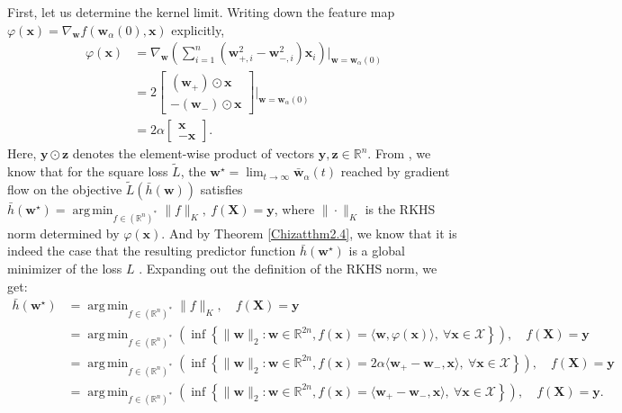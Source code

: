 \documentclass{article}
\DeclareMathOperator*{\argmin}{arg\,min}
\begin{document}
First, let us determine the kernel limit. Writing down the feature map $\varphi(\boldsymbol{x}) = \nabla_{\boldsymbol{w}} f(\boldsymbol{w}_{\alpha}(0), \boldsymbol{x})$ explicitly, 
\begin{align*}
    \varphi(\boldsymbol{x}) &= \nabla_{\boldsymbol{w}}\left( \sum_{i=1}^n(\boldsymbol{w}_{+, i}^2 - \boldsymbol{w}_{-, i}^2)\boldsymbol{x}_i \right)\bigg|_{\boldsymbol{w} = \boldsymbol{w}_{\alpha}(0)}\\
    &= 
    2\begin{bmatrix}
        (\boldsymbol{w}_+) \odot \boldsymbol{x}\\
        -(\boldsymbol{w}_-) \odot \boldsymbol{x}
    \end{bmatrix} \bigg|_{\boldsymbol{w} = \boldsymbol{w}_{\alpha}(0)}\\
    &= 2\alpha \begin{bmatrix}
        \boldsymbol{x}\\
        -\boldsymbol{x}
    \end{bmatrix}.
\end{align*}
Here, $\boldsymbol{y} \odot \boldsymbol{z}$ denotes the element-wise product of vectors $\boldsymbol{y}, \boldsymbol{z} \in \mathbb{R}^n$. From \cite{woodworth2020kernel}, we know that for the square loss $\tilde{L}$, the $\boldsymbol{w}^{\star} = \lim_{t \to \infty} \boldsymbol{\bar{w}}_{\alpha}(t)$ reached by gradient flow on the objective $\tilde{L}(\bar{h}(\boldsymbol{w}))$ satisfies $\bar{h}(\boldsymbol{w}^{\star}) = \argmin_{f \in (\mathbb{R}^n)^*} \| f \|_{K}, \ f(\boldsymbol{X}) = \boldsymbol{y}$, where $\| \cdot \|_K$ is the RKHS norm determined by $\varphi(\boldsymbol{x})$. And by Theorem \ref{Chizatthm2.4}, we know that it is indeed the case that the resulting predictor function $\bar{h}(\boldsymbol{w}^{\star})$ is a global minimizer of the loss $L$ \cite{chizat2018lazy}. Expanding out the definition of the RKHS norm, we get:
\begin{align}
    \bar{h}(\boldsymbol{w}^{\star}) &= \argmin_{f \in (\mathbb{R}^n)^*} \| f \|_{K}, \quad f(\boldsymbol{X}) = \boldsymbol{y} \nonumber\\
    &= \argmin_{f \in (\mathbb{R}^n)^*} \left( \inf \left\{ \| \boldsymbol{w} \|_2 : \boldsymbol{w} \in \mathbb{R}^{2n},  f(\boldsymbol{x}) = \langle \boldsymbol{w}, \varphi(\boldsymbol{x}) \rangle, \ \forall \boldsymbol{x} \in \mathcal{X} \right\}\right), \quad f(\boldsymbol{X}) = \boldsymbol{y} \nonumber\\
    &= \argmin_{f \in (\mathbb{R}^n)^*} \left( \inf \left\{ \| \boldsymbol{w} \|_2 : \boldsymbol{w} \in \mathbb{R}^{2n},  f(\boldsymbol{x}) = 2\alpha \langle \boldsymbol{w}_+ - \boldsymbol{w}_-, \boldsymbol{x} \rangle, \ \forall \boldsymbol{x} \in \mathcal{X} \right\}\right), \quad f(\boldsymbol{X}) = \boldsymbol{y} \nonumber\\
    &= \argmin_{f \in (\mathbb{R}^n)^*} \left( \inf \left\{ \| \boldsymbol{w} \|_2 : \boldsymbol{w} \in \mathbb{R}^{2n},  f(\boldsymbol{x}) = \langle \boldsymbol{w}_+ - \boldsymbol{w}_-, \boldsymbol{x} \rangle, \ \forall \boldsymbol{x} \in \mathcal{X} \right\}\right), \quad f(\boldsymbol{X}) = \boldsymbol{y}.\label{RKHSnorm}
\end{align}
\end{document}
